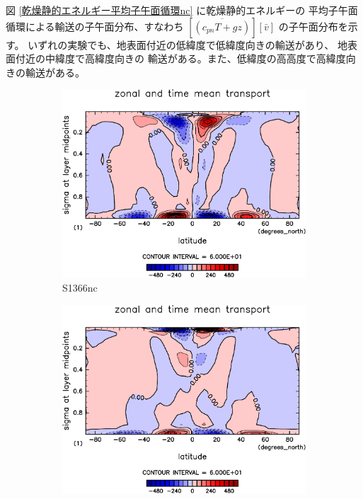 \documentclass[body]{subfiles}
\begin{document}
図 \ref{乾燥静的エネルギー平均子午面循環nc} に乾燥静的エネルギーの
平均子午面循環による輸送の子午面分布、すなわち 
\([\overline{(c_{pn}T+gz)}][\bar v]\) の子午面分布を示す。
いずれの実験でも、地表面付近の低緯度で低緯度向きの輸送があり、
地表面付近の中緯度で高緯度向きの
輸送がある。また、低緯度の高高度で高緯度向きの輸送がある。

\afterpage{\clearpage}

\begin{figure}[t]
	\centering
	\begin{subfigure}{.4\textwidth}
		\centering
		\includegraphics[width=\textwidth]{S1366-nc/MeriHeatTransTest@dryStatEn_M,time=3650:4015-crop-rotate.pdf}
		\caption{S1366nc}\label{乾燥静的エネルギー平均子午面循環S1366nc}
	\end{subfigure}
	\begin{subfigure}{.4\textwidth}
		\centering
		\includegraphics[width=\textwidth]{S1500-nc/MeriHeatTransTest@dryStatEn_M,time=3650:4015-crop-rotate.pdf}

\end{subfigure}
\end{figure}
\end{document}
